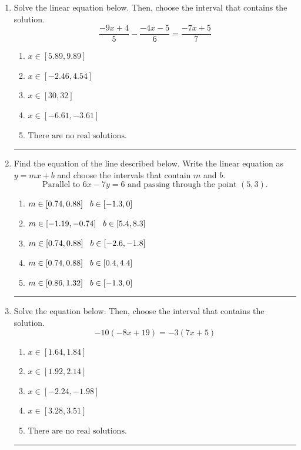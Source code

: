 \documentclass[14pt]{extbook}
\newcommand{\litem}[1]{\item#1\hspace*{-1cm}\rule{\textwidth}{0.4pt}}
\begin{document}
\begin{enumerate}
{\begin{enumerate}[label=\Alph*.]
\end{enumerate} }
\litem{
Solve the linear equation below. Then, choose the interval that contains the solution.\[ \frac{-9x + 4}{5} - \frac{-4x -5}{6} = \frac{-7x + 5}{7} \]\begin{enumerate}[label=\Alph*.]
\item \( x \in [5.89, 9.89] \)
\item \( x \in [-2.46, 4.54] \)
\item \( x \in [30, 32] \)
\item \( x \in [-6.61, -3.61] \)
\item \( \text{There are no real solutions.} \)

\end{enumerate} }
\litem{
Find the equation of the line described below. Write the linear equation as $ y=mx+b $ and choose the intervals that contain $m$ and $b$.\[ \text{Parallel to } 6 x - 7 y = 6 \text{ and passing through the point } (5, 3). \]\begin{enumerate}[label=\Alph*.]
\item \( m \in [0.74, 0.88] \hspace*{3mm} b \in [-1.3, 0] \)
\item \( m \in [-1.19, -0.74] \hspace*{3mm} b \in [5.4, 8.3] \)
\item \( m \in [0.74, 0.88] \hspace*{3mm} b \in [-2.6, -1.8] \)
\item \( m \in [0.74, 0.88] \hspace*{3mm} b \in [0.4, 4.4] \)
\item \( m \in [0.86, 1.32] \hspace*{3mm} b \in [-1.3, 0] \)

\end{enumerate} }
\litem{
Solve the equation below. Then, choose the interval that contains the solution.\[ -10(-8x + 19) = -3(7x + 5) \]\begin{enumerate}[label=\Alph*.]
\item \( x \in [1.64, 1.84] \)
\item \( x \in [1.92, 2.14] \)
\item \( x \in [-2.24, -1.98] \)
\item \( x \in [3.28, 3.51] \)
\item \( \text{There are no real solutions.} \)


\end{enumerate}}
\end{enumerate}
\end{document}
